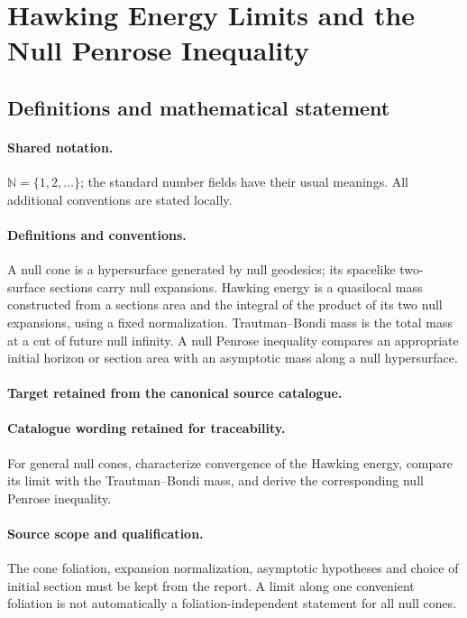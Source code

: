 \documentclass[11pt]{article}
\begin{document}
\section{Hawking Energy Limits and the Null Penrose Inequality}\label{statement}

\subsection{Definitions and mathematical statement}

\paragraph{Shared notation.}$\mathbb N=\{1,2,\ldots\}$; the standard number fields have their usual meanings. All additional conventions are stated locally.


\paragraph{Definitions and conventions.}
A null cone is a hypersurface generated by null geodesics; its spacelike two-surface sections carry null expansions. Hawking energy is a quasilocal mass constructed from a section\textquotesingle s area and the integral of the product of its two null expansions, using a fixed normalization. Trautman--Bondi mass is the total mass at a cut of future null infinity. A null Penrose inequality compares an appropriate initial horizon or section area with an asymptotic mass along a null hypersurface.

\paragraph{Target retained from the canonical source catalogue.}
\paragraph{Catalogue wording retained for traceability.}
For general null cones, characterize convergence of the Hawking energy, compare its limit with the Trautman–Bondi mass, and derive the corresponding null Penrose inequality.

\paragraph{Source scope and qualification.}
The cone foliation, expansion normalization, asymptotic hypotheses and choice of initial section must be kept from the report. A limit along one convenient foliation is not automatically a foliation-independent statement for all null cones.
\end{document}
